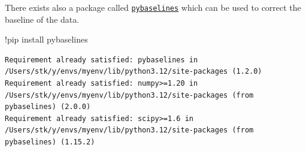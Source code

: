 \documentclass[
  letterpaper,
  DIV=11,
  numbers=noendperiod]{scrreprt}
\newenvironment{Shaded}{\begin{snugshade}}{\end{snugshade}}
\newcommand{\NormalTok}[1]{\textcolor[rgb]{0.00,0.23,0.31}{#1}}
\newcommand{\OperatorTok}[1]{\textcolor[rgb]{0.37,0.37,0.37}{#1}}
\begin{document}
There exists also a package called
\href{https://pybaselines.readthedocs.io/en/latest/}{\texttt{pybaselines}}
which can be used to correct the baseline of the data.

\begin{Shaded}
\begin{Highlighting}[]
\OperatorTok{!}\NormalTok{pip install pybaselines}
\end{Highlighting}
\end{Shaded}

\begin{verbatim}
Requirement already satisfied: pybaselines in /Users/stk/y/envs/myenv/lib/python3.12/site-packages (1.2.0)
Requirement already satisfied: numpy>=1.20 in /Users/stk/y/envs/myenv/lib/python3.12/site-packages (from pybaselines) (2.0.0)
Requirement already satisfied: scipy>=1.6 in /Users/stk/y/envs/myenv/lib/python3.12/site-packages (from pybaselines) (1.15.2)
\end{verbatim}
\end{document}
